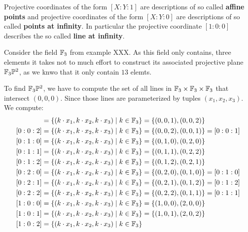 \begin{notation}
Projective coordinates of the form $[X:Y:1]$ are descriptions of so called \textbf{affine points} and projective coordinates of the form $[X:Y:0]$ are descriptions of so called \textbf{points at infinity}. In particular the projective coordinate $[1:0:0]$ describes the so called \textbf{line at infinity}.
\end{notation}
\begin{example} Consider the field $\mathbb{F}_3$ from example XXX. As this field only contains, three elements it takes not to much effort to construct its associated projective plane $\mathbb{F}_3\mathbb{P}^2$, as we knwo that it only contain $13$ elemts.

To find $\mathbb{F}_3\mathbb{P}^2$, we have to compute the set of all lines in $\mathbb{F}_3\times \mathbb{F}_3\times \mathbb{F}_3$ that intersect $(0,0,0)$. Since those lines are parameterized by tuples $(x_1,x_2,x_3)$. We compute:
\begin{align*}
[0:0:1] &= \{(k\cdot x_1,k\cdot x_2, k\cdot x_3)\;|\; k\in\F_3\}
          = \{(0,0,1), (0,0,2)\}\\
[0:0:2] &= \{(k\cdot x_1,k\cdot x_2, k\cdot x_3)\;|\; k\in\F_3\}
          = \{(0,0,2), (0,0,1)\}
          = [0:0:1]\\
[0:1:0] &= \{(k\cdot x_1,k\cdot x_2, k\cdot x_3)\;|\; k\in\F_3\}
          = \{(0,1,0), (0,2,0)\}\\
[0:1:1] &= \{(k\cdot x_1,k\cdot x_2, k\cdot x_3)\;|\; k\in\F_3\}
          = \{(0,1,1), (0,2,2)\}\\
[0:1:2] &= \{(k\cdot x_1,k\cdot x_2, k\cdot x_3)\;|\; k\in\F_3\}
          = \{(0,1,2), (0,2,1)\}\\
[0:2:0] &= \{(k\cdot x_1,k\cdot x_2, k\cdot x_3)\;|\; k\in\F_3\}
          = \{(0,2,0), (0,1,0)\}
          = [0:1:0]\\
[0:2:1] &= \{(k\cdot x_1,k\cdot x_2, k\cdot x_3)\;|\; k\in\F_3\}
          = \{(0,2,1), (0,1,2)\}
          = [0:1:2]\\
[0:2:2] &= \{(k\cdot x_1,k\cdot x_2, k\cdot x_3)\;|\; k\in\F_3\}
          = \{(0,2,2), (0,1,1)\}
          = [0:1:1]\\
[1:0:0] &= \{(k\cdot x_1,k\cdot x_2, k\cdot x_3)\;|\; k\in\F_3\}
          = \{(1,0,0), (2,0,0)\}\\
[1:0:1] &= \{(k\cdot x_1,k\cdot x_2, k\cdot x_3)\;|\; k\in\F_3\}
          = \{(1,0,1), (2,0,2)\}\\
[1:0:2] &= \{(k\cdot x_1,k\cdot x_2, k\cdot x_3)\;|\; k\in\F_3\}

\end{align*}
\end{example}
